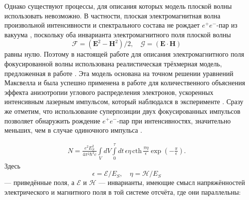 Однако существуют процессы, для описания которых модель плоской
волны использовать невозможно. В частности, плоская электромагнитная
волна произвольной интенсивности и спектрального состава не рождает
$e^+ e^-$-пар из вакуума \cite{schwinger}, поскольку оба инварианта
электромагнитного поля плоской волны
\[\mathcal F=(\mathbf E^2-\mathbf H^2)/2,\quad\mathcal G=(\mathbf E\cdot\mathbf H)\]    %
равны нулю. Поэтому в настоящей работе для описания
электромагнитного поля фокусированной волны использована
реалистическая трёхмерная модель, предложенная в работе
\cite{narozhny2}. Эта модель основана на точном решении уравнений
Максвелла и была успешно применена в работе \cite{narozhny3} для
количественного объяснения эффекта анизотропии углового
распределения электронов, ускоренных интенсивным лазерным импульсом,
который наблюдался в эксперименте \cite{malka}. Сразу же отметим,
что использование суперпозиции двух фокусированных импульсов
позволяет обнаружить рождение $e^+ e^-$-пар при интенсивностях,
значительно меньших, чем в случае одиночного импульса
\cite{narozhny4,narozhny5}.

\begin{equation}                %
 \label{pairs}
 \begin{aligned}                %
  N=\frac{e^2E_S^2}{4\pi^2\hbar^2c}\int\limits_{V}dV\int\limits_{0}^{\tau}dt\,
  \epsilon\eta\, \mathrm{cth}\,
  \frac{\pi\eta}{\epsilon}\exp\left(-\frac{\pi}{\epsilon}\right).
 \end{aligned}
\end{equation}
Здесь
$$\epsilon=\mathcal E/E_S,\quad\eta=\mathcal H/E_S$$
--- приведённые поля, а $\mathcal E$ и $\mathcal H$ --- инварианты,
имеющие смысл напряжённостей электрического и магнитного поля в той
системе отсчёта, где они параллельны:

